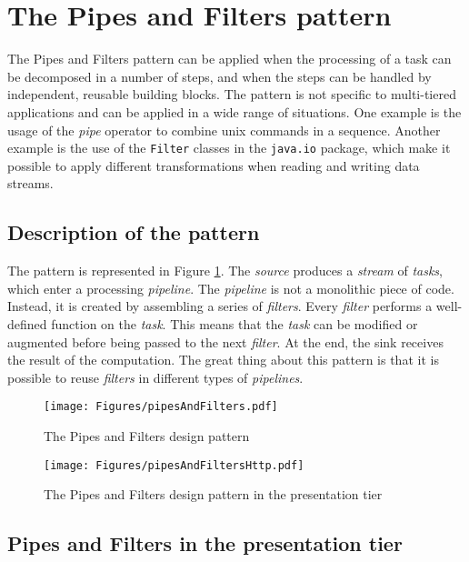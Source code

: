 \section{The Pipes and Filters pattern}

The Pipes and Filters pattern can be applied when the processing of a task can be decomposed in a number of steps, and when the steps can be handled by independent, reusable building blocks. The pattern is not specific to multi-tiered applications and can be applied in a wide range of situations. One example is the usage of the \emph{pipe} operator to combine unix commands in a sequence. Another example is the use of the \texttt{Filter} classes in the \texttt{java.io} package, which make it possible to apply different transformations when reading and writing data streams.

\subsection{Description of the pattern}

The pattern is represented in Figure \ref{fig:pipesAndFilters}. The \emph{source} produces a \emph{stream} of \emph{tasks}, which enter a processing \emph{pipeline}. The \emph{pipeline} is not a monolithic piece of code. Instead, it is created by assembling a series of \emph{filters}. Every \emph{filter} performs a well-defined function on the \emph{task}. This means that the \emph{task} can be modified or augmented before being passed to the next \emph{filter}. At the end, the sink receives the result of the computation. The great thing about this pattern is that it is possible to reuse \emph{filters} in different types of \emph{pipelines}. 

\begin{figure}[]
	\centering
    \texttt{[image: Figures/pipesAndFilters.pdf]}
	\caption{The Pipes and Filters design pattern}
  \label{fig:pipesAndFilters}
\end{figure}

\begin{figure}[]
	\centering
    \texttt{[image: Figures/pipesAndFiltersHttp.pdf]}
	\caption{The Pipes and Filters design pattern in the presentation tier}
  \label{fig:pipesAndFiltersHttp}
\end{figure}

\subsection{Pipes and Filters in the presentation tier}

